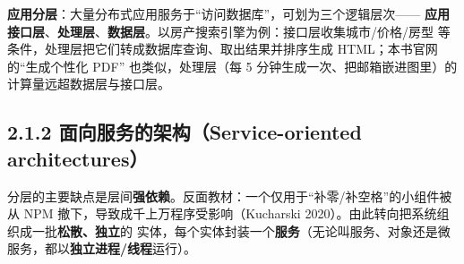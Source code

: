 \begin{closeread}
\end{closeread}


\medskip\noindent\textbf{应用分层}：大量分布式应用服务于“访问数据库”，可划为三个逻辑层次——
\textbf{应用接口层}、\textbf{处理层}、\textbf{数据层}。以房产搜索引擎为例：接口层收集城市/价格/房型
等条件，处理层把它们转成数据库查询、取出结果并排序生成 HTML；本书官网的“生成个性化 PDF”
也类似，处理层（每 5 分钟生成一次、把邮箱嵌进图里）的计算量远超数据层与接口层。

\subsection*{2.1.2 面向服务的架构（Service-oriented architectures）}
分层的主要缺点是层间\textbf{强依赖}。反面教材：一个仅用于“补零/补空格”的小组件被从 NPM
撤下，导致成千上万程序受影响（Kucharski 2020）。由此转向把系统组织成一批\textbf{松散、独立}的
实体，每个实体封装一个\textbf{服务}（无论叫服务、对象还是微服务，都以\textbf{独立进程/线程}运行）。

